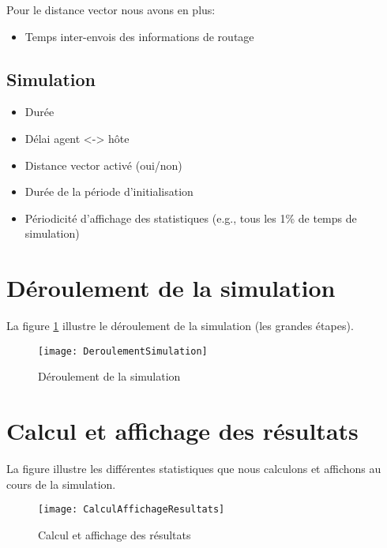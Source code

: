 \documentclass[a4paper,11pt]{article}
\begin{document}
Pour le distance vector nous avons en plus:
\begin{itemize}
 \item Temps inter-envois des informations de routage
\end{itemize}

\subsection{Simulation}
\begin{itemize}
 \item Durée
 \item Délai agent <-> hôte
 \item Distance vector activé (oui/non)
 \item Durée de la période d'initialisation
 \item Périodicité d'affichage des statistiques (e.g., tous les 1\% de temps de simulation)
\end{itemize}









\section{Déroulement de la simulation}
La figure \ref{fig:deroulement-simulation} illustre le déroulement de la simulation (les grandes étapes).

\begin{figure}[h!t]
  \centering
    \texttt{[image: DeroulementSimulation]}
  \caption{Déroulement de la simulation}
  \label{fig:deroulement-simulation}
\end{figure}







\section{Calcul et affichage des résultats}
La figure  illustre les différentes statistiques que nous calculons et affichons au cours de la simulation.

\begin{figure}[h!t]
  \centering
    \texttt{[image: CalculAffichageResultats]}
  \caption{Calcul et affichage des résultats}
  \label{fig:calcul-affichage-resultats}
\end{figure}
\end{document}
